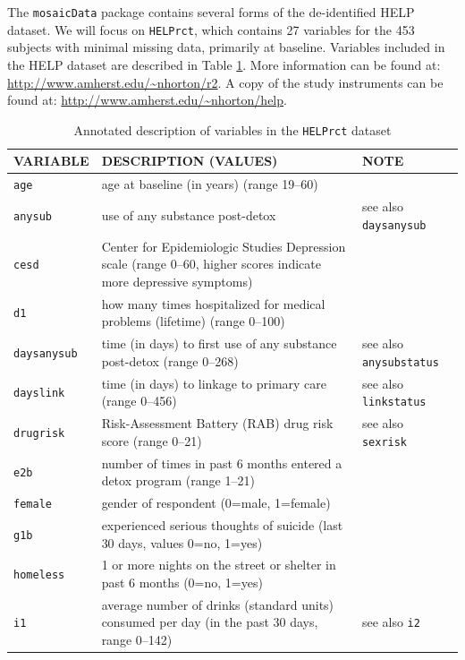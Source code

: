 \documentclass{tufte-book}\usepackage[]{graphicx}\usepackage[]{xcolor}
\renewcommand{\variable}[1]{{\color{black}\texttt{#1}}}
\renewcommand{\dataframe}[1]{{\color{black}\texttt{#1}}}
\renewcommand{\pkg}[1]{{\color{black}\texttt{#1}}}
\begin{document}
The \pkg{mosaicData} package contains several forms of the de-identified HELP dataset.
We will focus on \pkg{HELPrct}, which contains
27 variables for the 453 subjects
with minimal missing data, primarily at baseline.
Variables included in the HELP dataset are described in Table \ref{tab:helpvars}.  More information can be found at: \url{http://www.amherst.edu/~nhorton/r2}.
A copy of the study instruments can be found at: \url{http://www.amherst.edu/~nhorton/help}.
\begin{longtable}{|p{2.1cm}|p{6.8cm}|p{3.5cm}|}
\caption{Annotated description of variables in the \dataframe{HELPrct} dataset}
\label{tab:helpvars} \\
\hline
VARIABLE & DESCRIPTION (VALUES) & NOTE \\ \hline
\variable{age} & age at baseline (in years) (range 19--60) & \\ \hline
\variable{anysub} & use of any substance post-detox & see also \variable{daysanysub}
\\ \hline
\variable{cesd} & Center for Epidemiologic Studies Depression scale (range 0--60, higher scores indicate more depressive symptoms)  & \\ \hline
\variable{d1} & how many times hospitalized for medical problems (lifetime)  (range 0--100)  & \\ \hline
\variable{daysanysub} & time (in days) to first use of any substance post-detox (range 0--268)  & see also \variable{anysubstatus} \\ \hline
\variable{dayslink} & time (in days) to linkage to primary care (range 0--456)  & see also \variable{linkstatus}
\\ \hline
\variable{drugrisk} & Risk-Assessment Battery (RAB) drug risk score  (range 0--21)  & see also \variable{sexrisk}
\\ \hline
\variable{e2b} & number of times in past 6 months entered a detox program  (range 1--21)  & \\ \hline
\variable{female} & gender of respondent  (0=male, 1=female)  &
\\ \hline
\variable{g1b} & experienced serious thoughts of suicide (last 30 days, values 0=no, 1=yes)  &
\\ \hline
\variable{homeless} & 1 or more nights on the street or shelter in past 6 months (0=no, 1=yes) & 
\\ \hline
\variable{i1} & average number of drinks (standard units) consumed per day (in the past 30 days, range 0--142) & see also \variable{i2}
\\ \hline

\end{longtable}
\end{document}
